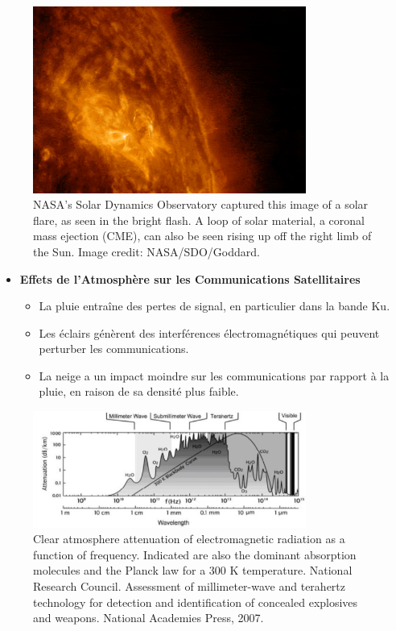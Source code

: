 \begin{figure}[H] %
    \centering
    \includegraphics[width=0.8\textwidth]{figures/solar-activity3.en.png}
    
    \caption{NASA’s Solar Dynamics Observatory captured this image of a solar flare, as seen in the bright flash. A loop of solar material, a coronal mass ejection (CME), can also be seen rising up off the right limb of the Sun. Image credit: NASA/SDO/Goddard.}
    \label{fig:communication2}
\end{figure}

\begin{itemize}
    \item \textbf{Effets de l'Atmosphère sur les Communications Satellitaires}
    \begin{itemize}
        \item La pluie entraîne des pertes de signal, en particulier dans la bande Ku.
        \item Les éclairs génèrent des interférences électromagnétiques qui peuvent perturber les communications.
        \item La neige a un impact moindre sur les communications par rapport à la pluie, en raison de sa densité plus faible.
    \end{itemize}
\end{itemize}

\begin{figure}[H] %
    \centering
    \includegraphics[width=0.8\textwidth]{figures/6-63.jpg}
    
    \caption{Clear atmosphere attenuation of electromagnetic radiation as a function of frequency. Indicated are also the dominant absorption molecules and the Planck law for a 300 K temperature. National Research Council. Assessment of millimeter-wave and terahertz technology for detection and identification of concealed explosives and weapons. National Academies Press, 2007.}
    \label{fig:communication2}
\end{figure}

